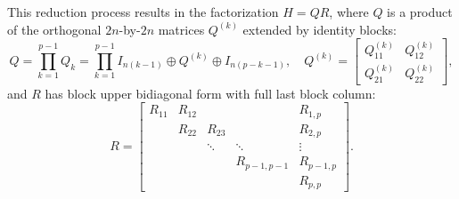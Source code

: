 \documentclass{llncs}
\begin{document}
This reduction process results in the factorization 
$H = QR$, where $Q$ is a product of 
the orthogonal $2n$-by-$2n$ matrices $Q^{(k)}$ extended 
by identity blocks: 
\begin{equation*} %
  Q = \prod_{k=1}^{p-1} Q_k = 
  \prod_{k=1}^{p-1} I_{n(k-1)}\oplus Q^{(k)} \oplus I_{n(p-k-1)}
  ,\quad %
  Q^{(k)} = 
  \begin{bmatrix}
    Q_{11}^{(k)} & Q_{12}^{(k)}\\
    Q_{21}^{(k)} & Q_{22}^{(k)}
  \end{bmatrix},
\end{equation*}
and $R$ has block upper bidiagonal form with full last block column:
\begin{equation}
  \label{eq:matr_R}
  R =
  \begin{bmatrix}
    R_{11} & R_{12} &         &             & R_{1,p} \\
           & R_{22} & R_{23}  &             & R_{2,p} \\
           &        & \ddots  & \ddots      &  \vdots \\
           &        &         & R_{p-1,p-1} & R_{p-1,p}  \\ 
           &        &         &             & R_{p,p}
  \end{bmatrix}.
\end{equation}
\end{document}
